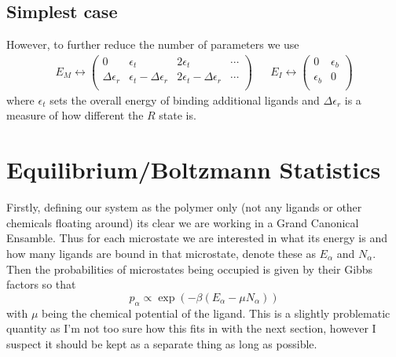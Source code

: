 \documentclass[11pt]{article}
\begin{document}
\subsection{Simplest case}
However, to further reduce the number of parameters we use
\begin{align}
    E_M \leftrightarrow \begin{pmatrix}
        0 & \epsilon_t & 2\epsilon_t & \cdots \\
        \Delta\epsilon_r & \epsilon_t - \Delta\epsilon_r & 2\epsilon_t - \Delta\epsilon_r & \cdots \\
    \end{pmatrix}
    &&
    E_I \leftrightarrow \begin{pmatrix}
        0 & \epsilon_b \\
        \epsilon_b & 0 \\
    \end{pmatrix}
\end{align}
where $\epsilon_t$ sets the overall energy of binding additional ligands and $\Delta\epsilon_r$ is a measure of how different the $R$ state is.

\section{Equilibrium/Boltzmann Statistics}
Firstly, defining our system as the polymer only (not any ligands or other chemicals floating around) its clear we are working in a Grand Canonical Ensamble.
Thus for each microstate we are interested in what its energy is and how many ligands are bound in that microstate, denote these as $E_\alpha$ and $N_\alpha$.
Then the probabilities of microstates being occupied is given by their Gibbs factors so that
\begin{equation}
    p_\alpha \propto \exp(-\beta(E_\alpha - \mu N_\alpha))
\end{equation}
with $\mu$ being the chemical potential of the ligand.
This is a slightly problematic quantity as I'm not too sure how this fits in with the next section, however I suspect it should be kept as a separate thing as long as possible.
\end{document}
